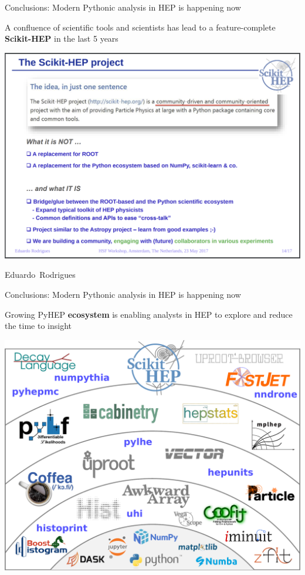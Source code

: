 \documentclass[aspectratio=169]{beamer}
\begin{document}
\begin{frame}{Conclusions: Modern Pythonic analysis in HEP is happening now}
\Large
\begin{center}
A confluence of scientific tools and scientists has lead to a feature-complete \textbf{Scikit-HEP} in the last 5 years
\end{center}
\vspace{0.1 cm}

\begin{center}
\href{https://indico.cern.ch/event/613842/contributions/2591057/}{\includegraphics[width=0.625\linewidth]{scikit-hep-in-2017.png}}
\end{center}

\vspace{-1.5 cm}
\hfill \mbox{Eduardo Rodrigues\hspace{-0.5 cm}}
\vspace{1.5 cm}
\end{frame}

\begin{frame}{Conclusions: Modern Pythonic analysis in HEP is happening now}
\Large
\begin{center}
Growing PyHEP \textbf{ecosystem} is enabling analysts in HEP to explore and reduce the time to insight
\end{center}
\vspace{0.1 cm}

\begin{center}
  \href{https://indico.cern.ch/event/1140031/}{\includegraphics[width=0.55\linewidth]{shells-hep.pdf}}
\end{center}
\end{frame}
\end{document}
